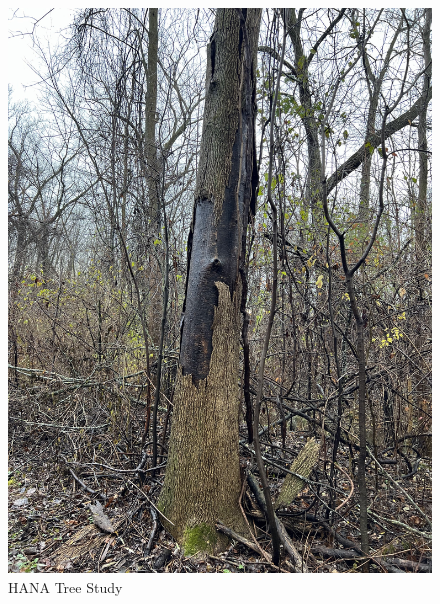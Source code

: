 \documentclass{article}
\begin{document}
\begin{figure}[h!]
\centering
\includegraphics[scale=.1]{Research/HANA/NOV2024/IMG_9848.JPG}
\caption{HANA Tree Study}
\label{fig:HANA}
\end{figure}
\end{document}
